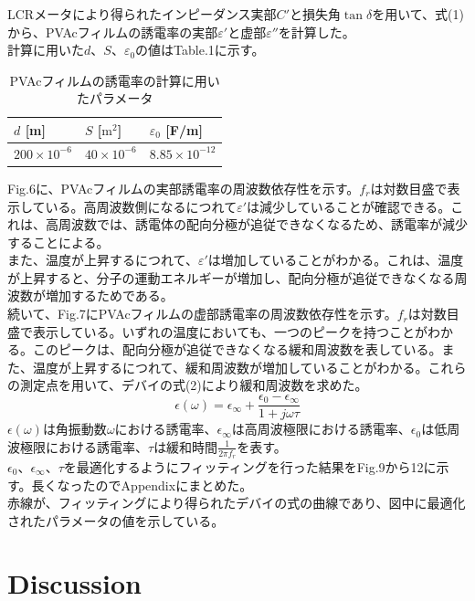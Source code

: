 \documentclass[a4paper,10pt]{jsarticle}
\begin{document}
\begin{multicols}{2}
LCRメータにより得られたインピーダンス実部$C'$と損失角$\tan\delta$を用いて、式(1)から、PVAcフィルムの誘電率の実部$ε'$と虚部$ε''$を計算した。\\
計算に用いた$d$、$S$、$ε_0$の値はTable.1に示す。
\begin{table}[H]
  \centering
  \caption{PVAcフィルムの誘電率の計算に用いたパラメータ}
  \begin{tabular}{lll}
    $d$ [m] & $S$ [$\text{m}^2$] & $\varepsilon_0$ [F/m] \\
    \midrule
    \midrule
    $200 \times 10^{-6}$ & $40 \times 10^{-6}$ & $8.85 \times 10^{-12}$ \\
  \end{tabular}
  \label{tab:addlabel}
\end{table}

Fig.6に、PVAcフィルムの実部誘電率の周波数依存性を示す。$f_r$は対数目盛で表示している。高周波数側になるにつれて$ε'$は減少していることが確認できる。これは、高周波数では、誘電体の配向分極が追従できなくなるため、誘電率が減少することによる。\\
また、温度が上昇するにつれて、$ε'$は増加していることがわかる。これは、温度が上昇すると、分子の運動エネルギーが増加し、配向分極が追従できなくなる周波数が増加するためである。\\
続いて、Fig.7にPVAcフィルムの虚部誘電率の周波数依存性を示す。$f_r$は対数目盛で表示している。いずれの温度においても、一つのピークを持つことがわかる。このピークは、配向分極が追従できなくなる緩和周波数を表している。また、温度が上昇するにつれて、緩和周波数が増加していることがわかる。これらの測定点を用いて、デバイの式(2)により緩和周波数を求めた。
\begin{equation}
  \epsilon(\omega) = \epsilon_\infty + \frac{{\epsilon_0 - \epsilon_\infty}}{{1 + j\omega\tau}}
\end{equation}
$\epsilon(\omega)$は角振動数$\omega$における誘電率、$\epsilon_\infty$は高周波極限における誘電率、$\epsilon_0$は低周波極限における誘電率、$\tau$は緩和時間$\frac{1}{2\pi f_r}$を表す。\\
$\epsilon_0$、$\epsilon_\infty$、$\tau$を最適化するようにフィッティングを行った結果をFig.9から12に示す。長くなったのでAppendixにまとめた。\\
赤線が、フィッティングにより得られたデバイの式の曲線であり、図中に最適化されたパラメータの値を示している。\\

\section{\textrm{Discussion}}

\end{multicols}
\end{document}
